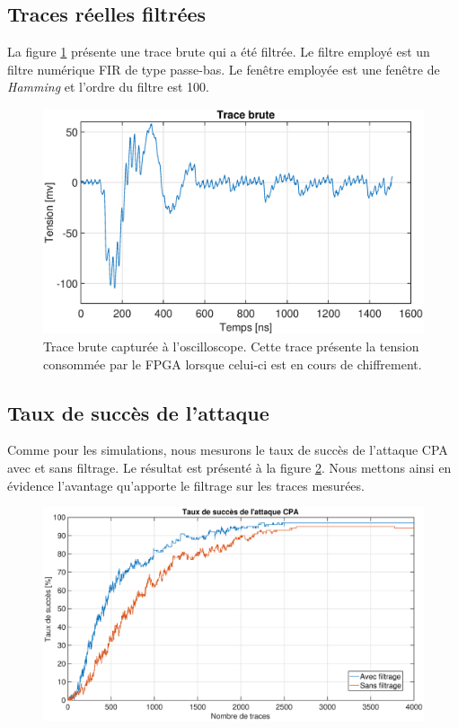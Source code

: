\documentclass[oneside]{book}
\begin{document}
\subsection{Traces réelles filtrées}
\label{sec:filter}

La figure \ref{fig:trace_brute} présente une trace brute qui a été filtrée. Le filtre employé est un filtre numérique FIR de type passe-bas. Le fenêtre employée est une fenêtre de \textit{Hamming} et l'ordre du filtre est 100. 

\begin{figure}[htbp]
    \hspace{-2cm}
    \includegraphics[scale=0.6]{image/trace_brute}
    \caption{Trace brute capturée à l'oscilloscope. Cette trace présente la tension consommée par le FPGA lorsque celui-ci est en cours de chiffrement.}
    \label{fig:trace_brute} 
\end{figure}

\subsection{Taux de succès de l'attaque}
\label{sec:success_rate}

Comme pour les simulations, nous mesurons le taux de succès de l'attaque CPA avec et sans filtrage. Le résultat est présenté à la figure \ref{fig:success_rate_real}. Nous mettons ainsi en évidence l'avantage qu'apporte le filtrage sur les traces mesurées.

\begin{figure}[htbp]
    \hspace{-2cm}
    \includegraphics[scale=0.6]{image/success_rate_real}
    \caption{}
    \label{fig:success_rate_real} 
\end{figure}
\end{document}
